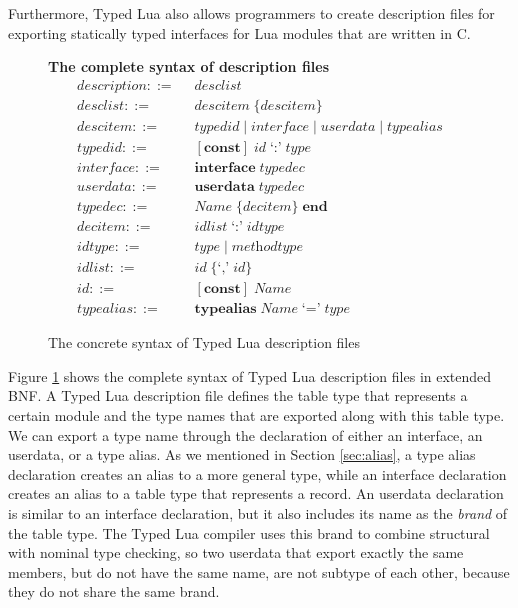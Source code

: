 Furthermore, Typed Lua also allows programmers to create description
files for exporting statically typed interfaces for Lua modules
that are written in C.

\begin{figure}[!ht]
\textbf{The complete syntax of description files}\\
\dstart
\begin{align*}
\textit{description} ::= & \;\; \textit{desclist}\\
\textit{desclist} ::= & \;\; \textit{descitem} \; \{ \textit{descitem} \}\\
\textit{descitem} ::= & \;\; \textit{typedid} \; | \;
  \textit{interface} \; | \;
  \textit{userdata} \; | \;
  \textit{typealias}\\
\textit{typedid} ::= & \;\; [\textbf{const}] \; \textit{id} \; \texttt{`:'} \; \textit{type}\\ 
\textit{interface} ::= & \;\; \textbf{interface} \; \textit{typedec}\\
\textit{userdata} ::= & \;\; \textbf{userdata} \; \textit{typedec}\\
\textit{typedec} ::= & \;\; \textit{Name} \; \{\textit{decitem}\} \; \textbf{end}\\
\textit{decitem} ::= & \;\; \textit{idlist} \; \texttt{`:'} \; \textit{idtype}\\
\textit{idtype} ::= & \;\; \textit{type} \; | \; \textit{methodtype}\\
\textit{idlist} ::= & \;\; \textit{id} \; \{\texttt{`,'} \; \textit{id}\}\\
\textit{id} ::= & \;\; [\textbf{const}] \; \textit{Name}\\
\textit{typealias} ::= & \;\; \textbf{typealias} \; \textit{Name} \; \texttt{`='} \; \textit{type}
\end{align*}
\dend
\caption{The concrete syntax of Typed Lua description files}
\label{fig:tldsyntax}
\end{figure}

Figure \ref{fig:tldsyntax} shows the complete syntax of Typed Lua
description files in extended BNF.
A Typed Lua description file defines the table type that represents
a certain module and the type names that are exported
along with this table type.
We can export a type name through the declaration of either an interface,
an userdata, or a type alias.
As we mentioned in Section \ref{sec:alias}, a type alias declaration
creates an alias to a more general type, while an interface declaration
creates an alias to a table type that represents a record.
An userdata declaration is similar to an interface declaration,
but it also includes its name as the \emph{brand} of the table type.
The Typed Lua compiler uses this brand to combine structural with
nominal type checking, so two userdata that export exactly the same members,
but do not have the same name, are not subtype of each other,
because they do not share the same brand.

